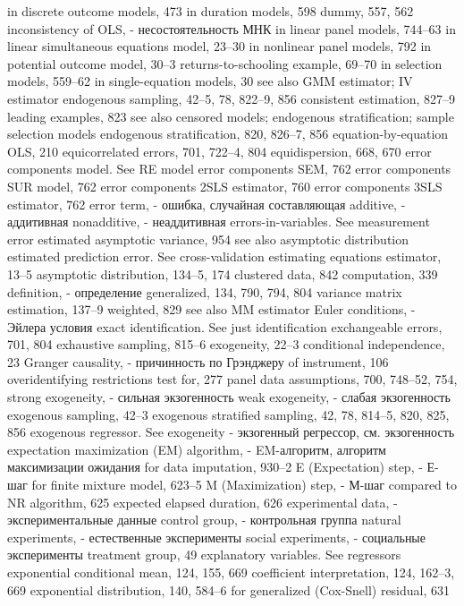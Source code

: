 in discrete outcome models, 473
in duration models, 598
dummy, 557, 562
inconsistency of OLS, - несостоятельность МНК
in linear panel models, 744–63
in linear simultaneous equations model, 23–30 in nonlinear panel models, 792
in potential outcome model, 30–3 returns-to-schooling example, 69–70
in selection models, 559–62
in single-equation models, 30
see also GMM estimator; IV estimator
endogenous sampling, 42–5, 78, 822–9, 856 consistent estimation, 827–9
leading examples, 823
see also censored models; endogenous
stratification; sample selection models endogenous stratification, 820, 826–7, 856 equation-by-equation OLS, 210 equicorrelated errors, 701, 722–4, 804 equidispersion, 668, 670
error components model. See RE model error components SEM, 762
error components SUR model, 762 error components 2SLS estimator, 760 error components 3SLS estimator, 762 
error term, - ошибка, случайная составляющая
additive, - аддитивная
nonadditive, - неаддитивная
errors-in-variables. See measurement error estimated asymptotic variance, 954
see also asymptotic distribution
estimated prediction error. See cross-validation estimating equations estimator, 13–5
asymptotic distribution, 134–5, 174 clustered data, 842
computation, 339
definition, - определение
generalized, 134, 790, 794, 804 variance matrix estimation, 137–9 weighted, 829
see also MM estimator
Euler conditions, - Эйлера условия
exact identification. See just identification exchangeable errors, 701, 804
exhaustive sampling, 815–6
exogeneity, 22–3
conditional independence, 23
Granger causality, - причинность по Грэнджеру
of instrument, 106
overidentifying restrictions test for, 277 panel data assumptions, 700, 748–52, 754,
strong exogeneity, - сильная экзогенность
weak exogeneity, - слабая экзогенность
exogenous sampling, 42–3
exogenous stratified sampling, 42, 78, 814–5, 820,
825, 856
exogenous regressor. See exogeneity - экзогенный регрессор, см. экзогенность
expectation maximization (EM) algorithm, - EM-алгоритм, алгоритм максимизации ожидания
for data imputation, 930–2
E (Expectation) step, - Е-шаг
for finite mixture model, 623–5 
M (Maximization) step, - М-шаг
compared to NR algorithm, 625
expected elapsed duration, 626 
experimental data, - экспериментальные данные
control group, - контрольная группа
natural experiments, - естественные эксперименты 
social experiments, - социальные эксперименты 
treatment group, 49
explanatory variables. See regressors exponential conditional mean, 124, 155, 669 
coefficient interpretation, 124, 162–3, 669
exponential distribution, 140, 584–6
for generalized (Cox-Snell) residual, 631
